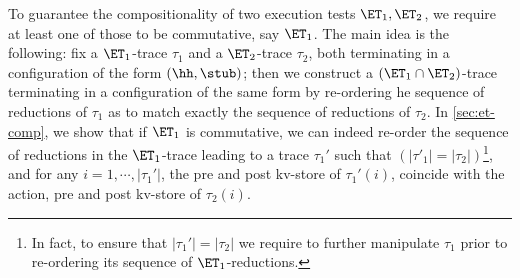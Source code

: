 To guarantee the compositionality of two execution tests $\ET_1, \ET_2$, we 
require at least one of those to be commutative, say $\ET_1$. The main idea 
is the following: fix a $\ET_1$-trace $\tau_1$ and a $\ET_2$-trace $\tau_2$, both terminating in a configuration 
of the form $(\hh, \stub)$; then we construct a $(\ET_1 \cap \ET_2)$-trace terminating 
in a configuration of the same form by re-ordering he sequence of 
reductions of $\tau_1$ as to match exactly the sequence of 
reductions of $\tau_2$. 
In \cref{sec:et-comp}, we show that if $\ET_1$ is commutative, 
we can indeed re-order the sequence of reductions in the 
$\ET_1$-trace leading to a trace $\tau_1'$ such that $(\lvert \tau'_1 \rvert = \lvert \tau_2 \rvert)$\footnote{In fact, 
to ensure that $\lvert \tau_1' \rvert = \lvert \tau_2 \rvert$ we require to further manipulate 
$\tau_1$ prior to re-ordering its sequence of $\ET_1$-reductions.}, 
and for any 
$i=1,\cdots, \lvert \tau_1'\rvert$, the pre and post kv-store of $\tau_1'(i)$,
 coincide with the action, pre and post kv-store 
of $\tau_2(i)$.


